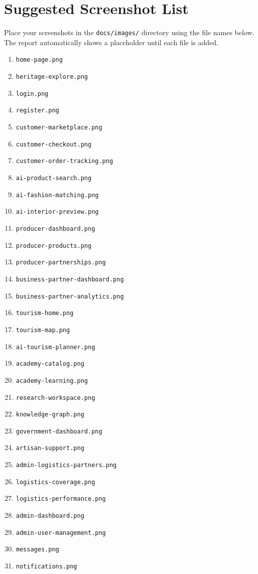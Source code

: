 \documentclass[12pt,a4paper]{report}
\begin{document}
\appendix
\chapter{Suggested Screenshot List}

Place your screenshots in the \texttt{docs/images/} directory using the file names below. The report automatically shows a placeholder until each file is added.

\begin{enumerate}
  \item \texttt{home-page.png}
  \item \texttt{heritage-explore.png}
  \item \texttt{login.png}
  \item \texttt{register.png}
  \item \texttt{customer-marketplace.png}
  \item \texttt{customer-checkout.png}
  \item \texttt{customer-order-tracking.png}
  \item \texttt{ai-product-search.png}
  \item \texttt{ai-fashion-matching.png}
  \item \texttt{ai-interior-preview.png}
  \item \texttt{producer-dashboard.png}
  \item \texttt{producer-products.png}
  \item \texttt{producer-partnerships.png}
  \item \texttt{business-partner-dashboard.png}
  \item \texttt{business-partner-analytics.png}
  \item \texttt{tourism-home.png}
  \item \texttt{tourism-map.png}
  \item \texttt{ai-tourism-planner.png}
  \item \texttt{academy-catalog.png}
  \item \texttt{academy-learning.png}
  \item \texttt{research-workspace.png}
  \item \texttt{knowledge-graph.png}
  \item \texttt{government-dashboard.png}
  \item \texttt{artisan-support.png}
  \item \texttt{admin-logistics-partners.png}
  \item \texttt{logistics-coverage.png}
  \item \texttt{logistics-performance.png}
  \item \texttt{admin-dashboard.png}
  \item \texttt{admin-user-management.png}
  \item \texttt{messages.png}
  \item \texttt{notifications.png}
\end{enumerate}
\end{document}
